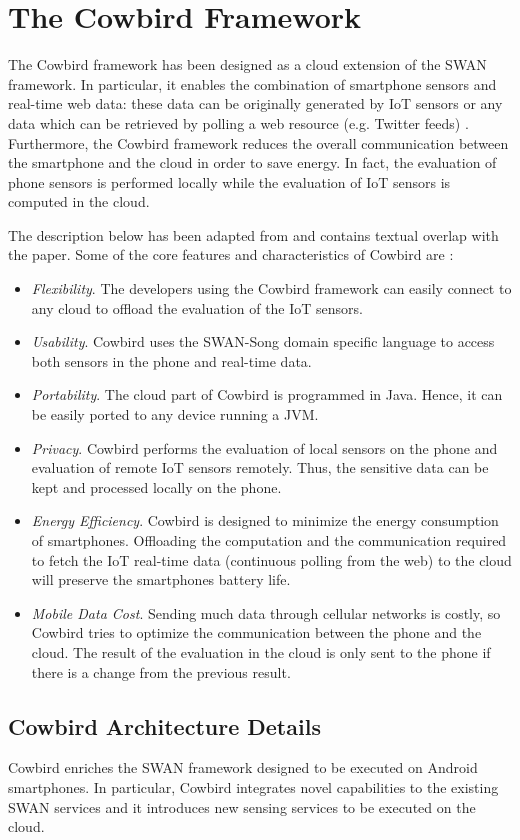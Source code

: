 \section{The Cowbird Framework}
The Cowbird framework has been designed as a cloud extension of the SWAN framework. In particular, it enables the combination of smartphone sensors and real-time web data: these data can be originally generated by IoT sensors or any data which can be retrieved by polling a web resource (e.g. Twitter feeds) \cite{cowbirdarticle}. Furthermore, the Cowbird framework reduces the overall communication between the smartphone and the cloud in order to save energy. In fact, the evaluation of phone sensors is performed locally while the evaluation of IoT sensors is computed in the cloud.


The description below has been adapted from \cite{cowbirdarticle} and contains textual overlap with the paper. Some of the core features and characteristics of Cowbird are \cite{cowbirdarticle}:
\begin{itemize}
\item \emph{Flexibility}. The developers using the Cowbird framework
can easily connect to any cloud to offload the evaluation of the IoT sensors.
\item \emph{Usability}. Cowbird uses the SWAN-Song domain specific language to access both sensors in the phone and real-time data.
\item \emph{Portability}. The cloud part of Cowbird is programmed in
Java. Hence, it can be easily ported to any device running a JVM.
\item \emph{Privacy}. Cowbird performs the evaluation of local sensors
on the phone and evaluation of remote IoT sensors remotely. Thus, the sensitive data can be kept and processed locally on the phone.
\item \emph{Energy Efficiency}. Cowbird is designed to minimize the energy consumption of smartphones. Offloading the computation and the communication required to fetch the IoT real-time data (continuous polling from the web) to the cloud will preserve the smartphones battery life.
\item \emph{Mobile Data Cost}. Sending much data through cellular
networks is costly, so Cowbird tries to optimize the communication between the phone and the cloud. The result of the evaluation in the cloud is only sent to the phone if there is a change from the previous result. 
\end{itemize}
\subsection{Cowbird Architecture Details}
Cowbird enriches the SWAN framework designed to be executed on Android smartphones. In particular, Cowbird integrates novel capabilities to the existing SWAN services and it introduces new sensing services to be executed on the cloud. 

